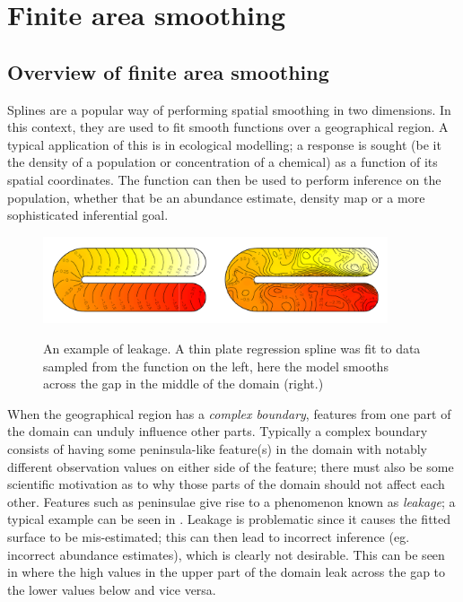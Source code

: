 	\ei
\ei

\section{Finite area smoothing}

\subsection{Overview of finite area smoothing}

Splines are a popular way of performing spatial smoothing in two dimensions. In this context, they are used to fit smooth functions over a geographical region. A typical application of this is in ecological modelling; a response is sought (be it the density of a population or concentration of a chemical) as a function of its spatial coordinates. The function can then be used to perform inference on the population, whether that be an abundance estimate, density map or a more sophisticated inferential goal.

\begin{figure}
\centering
\includegraphics[width=4in]{intro/figs/ramsay-leak.pdf}\\
\caption{An example of leakage. A thin plate regression spline was fit to data sampled from the function on the left, here the model smooths across the gap in the middle of the domain (right.)}
\label{leakage}
\end{figure}

When the geographical region has a \emph{complex boundary}, features from one part of the domain can unduly influence other parts. Typically a complex boundary consists of having some peninsula-like feature(s) in the domain with notably different observation values on either side of the feature; there must also be some scientific motivation as to why those parts of the domain should not affect each other. Features such as peninsulae give rise to a phenomenon known as \emph{leakage}; a typical example can be seen in . Leakage is problematic since it causes the fitted surface to be mis-estimated; this can then lead to incorrect inference (eg. incorrect abundance estimates), which is clearly not desirable. This can be seen in  where the high values in the upper part of the domain leak across the gap to the lower values below and vice versa.

